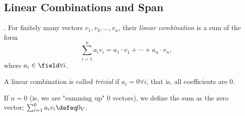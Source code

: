 \subsection{Linear Combinations and Span}

\begin{definition}
     . For finitely many vectors $v_1, v_2, \dots, v_n$, their \emph{linear combination} is a sum of the form \[
    \sum_{i=1}^{n} a_i v_i =  a_1 \cdot v_1 + \cdots + a_n \cdot v_n,
    \]
    where $a_i \in \field \forall i$.

    A linear combination is called \emph{trivial} if $a_i = 0 \forall i$, that is, all coefficients are $0$.

    If $n = 0$ (ie, we are "summing up" 0 vectors), we define the sum as the zero vector; $\sum_{i=1}^{0} a_i v_i \defeq 0_V$.
\end{definition}